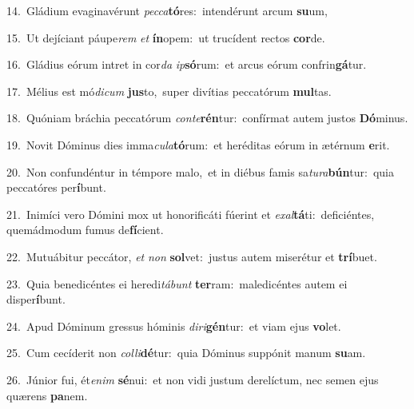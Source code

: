 {\numbfont\textcolor{\numbcolor}{14.}}~Gládium evaginavérunt \textit{pec}\-\textit{ca}\textbf{tó}res:~\star intendérunt arcum \textbf{su}\-um,\par
{\numbfont\textcolor{\numbcolor}{15.}}~Ut dejíciant páupe\textit{rem} \textit{et} \textbf{ín}\-opem:~\star ut trucídent rectos \textbf{cor}\-de.\par
{\numbfont\textcolor{\numbcolor}{16.}}~Gládius eórum intret in cor\textit{da} \textit{ip}\-\textbf{só}rum:~\star et arcus eórum confrin\-\textbf{gá}\-tur.\par
{\numbfont\textcolor{\numbcolor}{17.}}~Mélius est mó\-\textit{di}\-\textit{cum} \textbf{jus}\-to,~\star super divítias peccatórum \textbf{mul}\-tas.\par
{\numbfont\textcolor{\numbcolor}{18.}}~Quóniam bráchia peccatórum \textit{con}\-\textit{te}\textbf{rén}tur:~\star confírmat autem justos \textbf{Dó}\-minus.\par
{\numbfont\textcolor{\numbcolor}{19.}}~Novit Dóminus dies imma\-\textit{cu}\-\textit{la}\textbf{tó}rum:~\star et heréditas eórum in ætérnum \textbf{e}\-rit.\par
{\numbfont\textcolor{\numbcolor}{20.}}~Non confundéntur in témpore malo,~\dagger et in diébus famis sa\-\textit{tu}\-\textit{ra}\textbf{bún}tur:~\star quia peccatóres per\-\textbf{í}\-bunt.\par
{\numbfont\textcolor{\numbcolor}{21.}}~Inimíci vero Dómini mox ut honorificáti fúerint et \textit{ex}\-\textit{al}\textbf{tá}ti:~\star deficiéntes, quemádmodum fumus de\-\textbf{fí}\-cient.\par
{\numbfont\textcolor{\numbcolor}{22.}}~Mutuábitur peccátor, \textit{et} \textit{non} \textbf{sol}\-vet:~\star justus autem miserétur et \textbf{trí}\-buet.\par
{\numbfont\textcolor{\numbcolor}{23.}}~Quia benedicéntes ei heredi\-\textit{tá}\-\textit{bunt} \textbf{ter}\-ram:~\star maledicéntes autem ei disper\-\textbf{í}\-bunt.\par
{\numbfont\textcolor{\numbcolor}{24.}}~Apud Dóminum gressus hóminis \textit{di}\-\textit{ri}\textbf{gén}tur:~\star et viam ejus \textbf{vo}\-let.\par
{\numbfont\textcolor{\numbcolor}{25.}}~Cum cecíderit non \textit{col}\-\textit{li}\textbf{dé}tur:~\star quia Dóminus suppónit manum \textbf{su}\-am.\par
{\numbfont\textcolor{\numbcolor}{26.}}~Júnior fui, ét\-\textit{e}\-\textit{nim} \textbf{sé}\-nui:~\star et non vidi justum derelíctum, nec semen ejus quærens \textbf{pa}\-nem.\par
